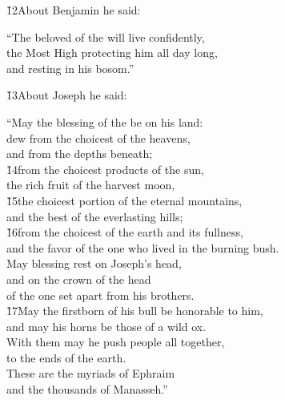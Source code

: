 \v{12}About Benjamin he said:

\begin{poetry}
\poeml ``The beloved of the  will live confidently, \\
\poemll    the Most High protecting him all day long, \\
\poemlll       and resting in his bosom.''
\end{poetry}

\v{13}About Joseph he said:

\begin{poetry}
\poeml ``May the blessing of the  be on his land: \\
\poemll    dew from the choicest of the heavens, \\
\poemlll       and from the depths beneath; \\
\poeml \v{14}from the choicest products of the sun, \\
\poemll    the rich fruit of the harvest moon, \\
\poeml \v{15}the choicest portion of the eternal mountains, \\
\poemll    and the best of the everlasting hills; \\
\poeml \v{16}from the choicest of the earth and its fullness, \\
\poemll    and the favor of the one who lived in the burning bush. \\
\poeml May blessing rest on Joseph's head, \\
\poemll    and on the crown of the head \\
\poemlll       of the one set apart from his brothers. \\
\poeml \v{17}May the firstborn of his bull be honorable to him, \\
\poemll    and may his horns be those of a wild ox. \\
\poeml With them may he push people all together, \\
\poemll    to the ends of the earth. \\
\poeml These are the myriads of Ephraim \\
\poemll    and the thousands of Manasseh.''
\end{poetry}

